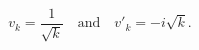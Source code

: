 \begin{equation}\label{eq:Minkowski}
v_k=\frac{1}{\sqrt{k}}\quad \text{and} \quad
v'_k=-i\sqrt{k}.
\end{equation}

